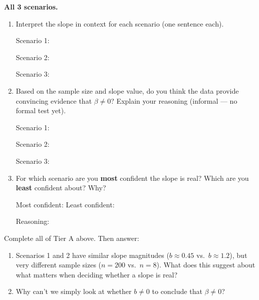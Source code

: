 \documentclass[10pt]{article}
\begin{document}
\begin{tcolorbox}[colback=white, colframe=black!40,
    title=\textbf{Tier A --- Approaching Proficiency},
    fonttitle=\bfseries, arc=2mm, left=3mm, right=3mm, top=2mm, bottom=2mm]

\textbf{All 3 scenarios.}

\begin{enumerate}[label=\alph*.]

  \item Interpret the slope in context for each scenario (one sentence each).

        Scenario 1: 

        Scenario 2: 

        Scenario 3: 

  \item Based on the sample size and slope value, do you think the data provide
        convincing evidence that $\beta \ne 0$? Explain your reasoning (informal --- no
        formal test yet).

        Scenario 1: 

        Scenario 2: 

        Scenario 3: 

  \item For which scenario are you \textbf{most} confident the slope is real?
        Which are you \textbf{least} confident about? Why?

        Most confident: \blank{3cm} \quad Least confident: \blank{3cm}

        Reasoning: 

\end{enumerate}
\end{tcolorbox}

\begin{tcolorbox}[colback=white, colframe=black!40,
    title=\textbf{Tier E --- Extension},
    fonttitle=\bfseries, arc=2mm, left=3mm, right=3mm, top=2mm, bottom=2mm]

Complete all of Tier A above. Then answer:

\begin{enumerate}[label=\alph*., start=4]

  \item Scenarios 1 and 2 have similar slope magnitudes ($b \approx 0.45$ vs.\ $b \approx 1.2$),
        but very different sample sizes ($n = 200$ vs.\ $n = 8$). What does this suggest
        about what matters when deciding whether a slope is real?


  \item Why can't we simply look at whether $b \ne 0$ to conclude that $\beta \ne 0$?


\end{enumerate}
\end{tcolorbox}
\end{document}
